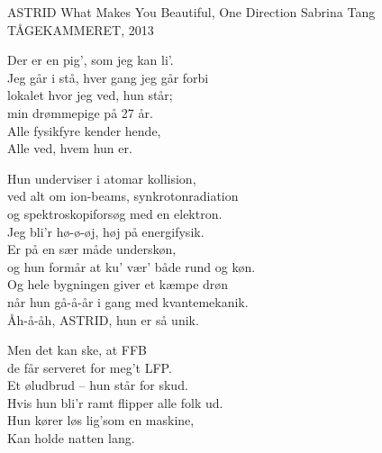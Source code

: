 \begin{song}{ASTRID}
  {} %
  {What Makes You Beautiful, One Direction} %
  {Sabrina Tang} %
  {TÅGEKAMMERET, 2013} %
  {\NotCCLIed} %

  \begin{SBVerse}
    Der er en pig’, som jeg kan li’.\\
    Jeg går i stå, hver gang jeg går forbi\\
    lokalet hvor jeg ved, hun står;\\
    min drømmepige på 27 år.\\\medskip
    Alle fysikfyre kender hende,\\
    Alle ved, hvem hun er.
  \end{SBVerse}

  \begin{SBChorus}
    Hun underviser i atomar kollision,\\
    ved alt om ion-beams, synkrotonradiation\\
    og spektroskopiforsøg med en elektron.\\
    Jeg bli’r hø-ø-øj, høj på energifysik.\\\medskip
    Er på en sær måde underskøn,\\
    og hun formår at ku’ vær’ både rund og køn.\\
    Og hele bygningen giver et kæmpe drøn\\
    når hun gå-å-år i gang med kvantemekanik.\\
    Åh-å-åh, ASTRID, hun er så unik.
  \end{SBChorus}

  \begin{SBVerse}
    Men det kan ske, at FFB\\
    de får serveret for meg’t LFP.\\
    Et øludbrud – hun står for skud.\\
    Hvis hun bli’r ramt flipper alle folk ud.\\\medskip
    Hun kører løs lig’som en maskine,\\
    Kan holde natten lang.
  \end{SBVerse}


\end{song}
